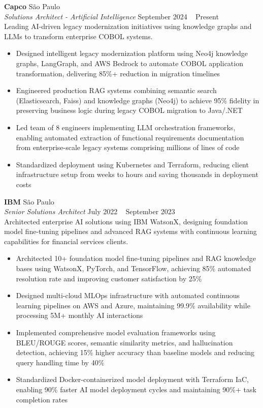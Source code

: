 \documentclass[a4paper]{article}
\begin{document}
\textbf{Capco}                                                      \hfill São Paulo              \\
\textit{Solutions Architect - Artificial Intelligence}               \hfill September 2024 ~ Present    \\
\vspace{0.5mm}
Leading AI-driven legacy modernization initiatives using knowledge graphs and LLMs to transform enterprise COBOL systems.
\vspace{-2mm}
\begin{itemize}
\setlength\itemsep{-1mm}
\item Designed intelligent legacy modernization platform using Neo4j knowledge graphs, LangGraph, and AWS Bedrock to automate COBOL application transformation, delivering 85\%+ reduction in migration timelines
\item Engineered production RAG systems combining semantic search (Elasticsearch, Faiss) and knowledge graphs (Neo4j) to achieve 95\% fidelity in preserving business logic during legacy COBOL migration to Java/.NET
\item Led team of 8 engineers implementing LLM orchestration frameworks, enabling automated extraction of functional requirements documentation from enterprise-scale legacy systems comprising millions of lines of code
\item Standardized deployment using Kubernetes and Terraform, reducing client infrastructure setup from weeks to hours and saving thousands in deployment costs
\end{itemize}

\textbf{IBM}                                                      \hfill São Paulo              \\
\textit{Senior Solutions Architect}                               \hfill July 2022 ~ September 2023    \\
\vspace{0.5mm}
Architected enterprise AI solutions using IBM WatsonX, designing foundation model fine-tuning pipelines and advanced RAG systems with continuous learning capabilities for financial services clients.
\begin{itemize}
\setlength\itemsep{-1mm}
\item Architected 10+ foundation model fine-tuning pipelines and RAG knowledge bases using WatsonX, PyTorch, and TensorFlow, achieving 85\% automated resolution rate and improving customer satisfaction by 25\%
\item Designed multi-cloud MLOps infrastructure with automated continuous learning pipelines on AWS and Azure, maintaining 99.9\% availability while processing 5M+ monthly AI interactions
\item Implemented comprehensive model evaluation frameworks using BLEU/ROUGE scores, semantic similarity metrics, and hallucination detection, achieving 15\% higher accuracy than baseline models and reducing query handling time by 40\%
\item Standardized Docker-containerized model deployment with Terraform IaC, enabling 90\% faster AI model deployment cycles and maintaining 90\%+ task completion rates
\end{itemize}
\end{document}
